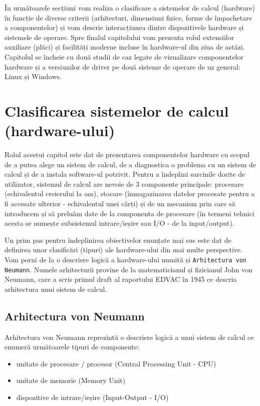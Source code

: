 În următoarele secțiuni vom realiza o clasificare a sistemelor de calcul
(hardware) în funcție de diverse criterii (arhitecturi, dimensiuni fizice, forme
de împachetare a componentelor) și vom descrie interacțiunea dintre
dispozitivele hardware și sistemele de operare. Spre finalul capitolului vom
prezenta rolul extensiilor auxiliare (plăci) și facilități moderne incluse în
hardware-ul din ziua de astăzi. Capitolul se încheie cu două studii de caz
legate de vizualizare componentelor hardware și a versiunilor de driver pe două
sisteme de operare de uz general: Linux și Windows.

\section{Clasificarea sistemelor de calcul (hardware-ului)}
\label{sec:hw:class}

Rolul acestui capitol este dat de prezentarea componentelor hardware cu scopul
de a putea alege un sistem de calcul, de a diagnostica o problema cu un sistem de
calcul și de a instala software-ul potrivit. Pentru a îndeplini sarcinile dorite de utilizator, sistemul de calcul are nevoie de 3
componente principale: procesare (echivalentul creierului la om), stocare
(înmagazinarea datelor procesate pentru a fi accesate ulterior - echivalentul
unei cărți) și de un mecanism prin care să introducem și să preluăm date de la
componenta de procesare (în termeni tehnici acesta se numește subsistemul
intrare/ieșire sau I/O - de la input/output).

Un prim pas pentru îndeplinirea obiectivelor enunțate mai sus este dat de
definirea unor clasificări (tipuri) ale hardware-ului din mai multe perspective.
Vom porni de la o descriere logică a hardware-ului numită și \texttt{Arhitectura
von Neumann}. Numele arhitecturii provine de la matematicianul și fizicianul
John von Neumann, care a scris primul draft al raportului EDVAC
 în 1945 ce
descria arhitectura unui sistem de calcul.

\subsection{Arhitectura von Neumann}
\label{sec:hw:class:von-neumann}

Arhitectura von Neumann reprezintă o descriere logică a unui sistem de calcul ce
enumeră următoarele tipuri de componente:

\begin{itemize}
  \item unitate de procesare / procesor (Central Processing Unit - CPU)
  \item unitate de memorie (Memory Unit) 
  \item dispozitive de intrare/ieșire (Input-Output - I/O)
\end{itemize}

